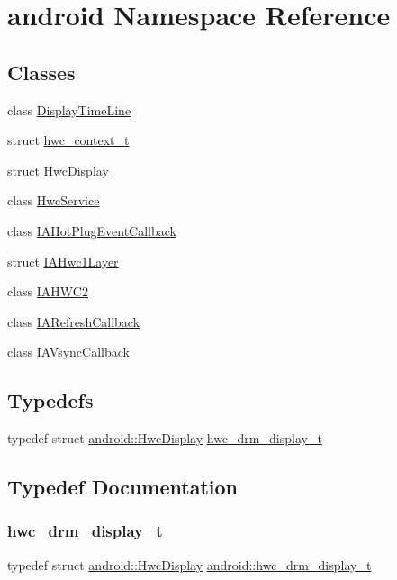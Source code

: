 \hypertarget{namespaceandroid}{}\section{android Namespace Reference}
\label{namespaceandroid}
\subsection*{Classes}
\begin{DoxyCompactItemize}
\item 
class \mbox{\hyperlink{classandroid_1_1DisplayTimeLine}{Display\+Time\+Line}}
\item 
struct \mbox{\hyperlink{structandroid_1_1hwc__context__t}{hwc\+\_\+context\+\_\+t}}
\item 
struct \mbox{\hyperlink{structandroid_1_1HwcDisplay}{Hwc\+Display}}
\item 
class \mbox{\hyperlink{classandroid_1_1HwcService}{Hwc\+Service}}
\item 
class \mbox{\hyperlink{classandroid_1_1IAHotPlugEventCallback}{I\+A\+Hot\+Plug\+Event\+Callback}}
\item 
struct \mbox{\hyperlink{structandroid_1_1IAHwc1Layer}{I\+A\+Hwc1\+Layer}}
\item 
class \mbox{\hyperlink{classandroid_1_1IAHWC2}{I\+A\+H\+W\+C2}}
\item 
class \mbox{\hyperlink{classandroid_1_1IARefreshCallback}{I\+A\+Refresh\+Callback}}
\item 
class \mbox{\hyperlink{classandroid_1_1IAVsyncCallback}{I\+A\+Vsync\+Callback}}
\end{DoxyCompactItemize}
\subsection*{Typedefs}
\begin{DoxyCompactItemize}
\item 
typedef struct \mbox{\hyperlink{structandroid_1_1HwcDisplay}{android\+::\+Hwc\+Display}} \mbox{\hyperlink{namespaceandroid_aee90acab9a30a307eb5d543e7f967247}{hwc\+\_\+drm\+\_\+display\+\_\+t}}
\end{DoxyCompactItemize}


\subsection{Typedef Documentation}
\mbox{\label{namespaceandroid_aee90acab9a30a307eb5d543e7f967247}} 
\subsubsection{\texorpdfstring{hwc\+\_\+drm\+\_\+display\+\_\+t}{hwc\_drm\_display\_t}}
{\footnotesize\ttfamily typedef struct \mbox{\hyperlink{structandroid_1_1HwcDisplay}{android\+::\+Hwc\+Display}}  \mbox{\hyperlink{namespaceandroid_aee90acab9a30a307eb5d543e7f967247}{android\+::hwc\+\_\+drm\+\_\+display\+\_\+t}}}


